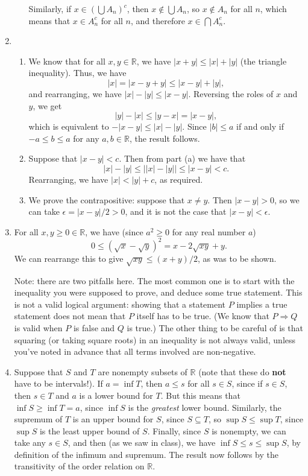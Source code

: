 \documentclass[12pt,letterpaper]{article}
\newcommand{\abs}[1]{\lvert #1\rvert}
\begin{document}
\begin{enumerate}
\begin{enumerate}
Similarly, if $x\in\left(\bigcup A_n\right)^c$, then $x\notin \bigcup A_n$, so $x\notin A_n$ for all $n$, which means that $x\in A_n^c$ for all $n$, and therefore $x\in \bigcap A_n^c$. 
\end{enumerate}
\item \begin{enumerate}
\item We know that for all $x,y\in\mathbb{R}$, we have $\abs{x+y}\leq\abs{x}+\abs{y}$ (the triangle inequality). Thus, we have
\[
\abs{x} = \abs{x-y+y} \leq \abs{x-y}+\abs{y},
\]
and rearranging, we have $\abs{x}-\abs{y}\leq \abs{x-y}$. Reversing the roles of $x$ and $y$, we get
\[
\abs{y}-\abs{x} \leq \abs{y-x}=\abs{x-y},
\]
which is equivalent to $-\abs{x-y}\leq \abs{x}-\abs{y}$. Since $\abs{b}\leq a$ if and only if $-a\leq b\leq a$ for any $a,b\in\mathbb{R}$, the result follows.
\item Suppose that $\abs{x-y}<c$. Then from part (a) we have that
\[
\abs{x}-\abs{y}\leq \abs{\abs{x}-\abs{y}}\leq \abs{x-y}<c.
\]
Rearranging, we have $\abs{x}<\abs{y}+c$, as required.
\item We prove the contrapositive: suppose that $x\neq y$. Then $\abs{x-y}>0$, so we can take $\epsilon=\abs{x-y}/2>0$, and it is not the case that $\abs{x-y}<\epsilon$.
\end{enumerate}
\item For all $x,y\geq 0\in \mathbb{R}$, we have (since $a^2\geq 0$ for any real number $a$)
\[
0\leq (\sqrt{x}-\sqrt{y})^2 = x-2\sqrt{xy}+y.
\]
We can rearrange this to give $\sqrt{xy}\leq (x+y)/2$, as was to be shown.

Note: there are two pitfalls here. The most common one is to start with the inequality you were supposed to prove, and deduce some true statement. This is not a valid logical argument: showing that a statement $P$ implies a true statement does not mean that $P$ itself has to be true. (We know that $P\Rightarrow Q$ is valid when $P$ is false and $Q$ is true.) The other thing to be careful of is that squaring (or taking square roots) in an inequality is not always valid, unless you've noted in advance that all terms involved are non-negative.

\item Suppose that $S$ and $T$ are nonempty subsets of $\mathbb{R}$ (note that these do {\bf not} have to be intervals!). If $a=\inf T$, then $a\leq s$ for all $s\in S$, since if $s\in S$, then $s\in T$ and $a$ is a lower bound for $T$. But this means that $\inf S\geq \inf T=a$, since $\inf S$ is the {\em greatest} lower bound. Similarly, the supremum of $T$ is an upper bound for $S$, since $S\subseteq T$, so $\sup S\leq \sup T$, since $\sup S$ is the least upper bound of $S$. Finally, since $S$ is nonempty, we can take any $s\in S$, and then (as we saw in class), we have $\inf S\leq s\leq \sup S$, by definition of the infimum and supremum. The result now follows by the transitivity of the order relation on $\mathbb{R}$.
\end{enumerate}
\end{document}
